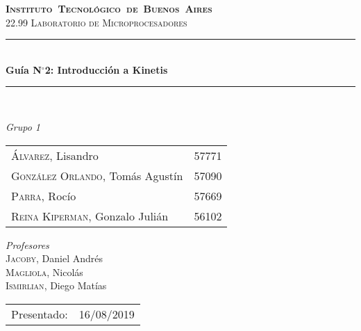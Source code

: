 \begin{titlepage}

\def\titulo{Gu\'ia N$^\circ$2: Introducción a Kinetis}
\def\fecha-entrega{16/08/2019}



\newcommand{\HRule}{\rule{\linewidth}{0.5mm}}
\center
\mbox{\textsc{\LARGE \bfseries {Instituto Tecnol\'ogico de Buenos Aires}}}\\[1.5cm]
\textsc{\Large 22.99 Laboratorio de Microprocesadores}\\[0.5cm]


\HRule \\[0.6cm]
{ \Huge \bfseries \titulo }\\[0.4cm] %
\HRule \\[1.5cm]


{\large

\emph{Grupo 1}\\
\vspace{3px}

\begin{tabular}{lr} 	
\textsc{\'Alvarez}, Lisandro  & 57771 \\
\textsc{Gonz\'alez Orlando}, Tom\'as Agust\'in  & 57090 \\
\textsc{Parra}, Roc\'io  & 57669 \\
\textsc{Reina Kiperman}, Gonzalo Juli\'an  & 56102 \\
\end{tabular}

\vspace{30px}

\emph{Profesores}\\
\vspace{3px}
\textsc{Jacoby}, Daniel Andr\'es\\ 	
\textsc{Magliola}, Nicol\'as\\ 	
\textsc{Ismirlian}, Diego Mat\'ias\\ 	

\vspace{120px}

\begin{tabular}{ll}

Presentado: & \fecha-entrega\\

\end{tabular}

}

\vfill

\end{titlepage}